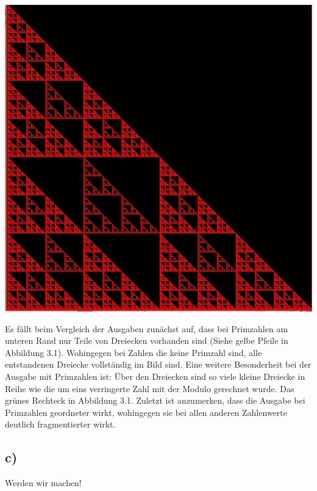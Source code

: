 \documentclass[10pt,a4paper]{article}
\begin{document}
\begin{center}
	\includegraphics[scale=0.5]{Screens/noPrim.jpg}
	\label{fig:noprim}
\end{center}
Es fällt beim Vergleich der Ausgaben zunächst auf, dass bei Primzahlen am unteren Rand nur Teile von Dreiecken vorhanden sind (Siehe gelbe Pfeile in Abbildung 3.1). Wohingegen bei Zahlen die keine Primzahl sind, alle entstandenen Dreiecke vollständig im Bild sind. Eine weitere Besonderheit bei der Ausgabe mit Primzahlen ist: Über den Dreiecken sind so viele kleine Dreiecke in Reihe wie die um eins verringerte Zahl mit der Modulo gerechnet wurde. Das grünes Rechteck in Abbildung 3.1. Zuletzt ist anzumerken, dass die Ausgabe bei Primzahlen geordneter wirkt, wohingegen sie bei allen anderen Zahlenwerte deutlich fragmentierter wirkt.
\subsection*{c)}
Werden wir machen!
\end{document}
